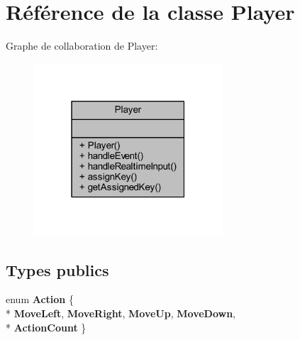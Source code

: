\hypertarget{class_player}{}\section{Référence de la classe Player}
\label{class_player}


Graphe de collaboration de Player\+:\nopagebreak
\begin{figure}[H]
\begin{center}
\leavevmode
\includegraphics[width=199pt]{class_player__coll__graph}
\end{center}
\end{figure}
\subsection*{Types publics}
\begin{DoxyCompactItemize}
\item 
enum {\bfseries Action} \{ \\*
{\bfseries Move\+Left}, 
{\bfseries Move\+Right}, 
{\bfseries Move\+Up}, 
{\bfseries Move\+Down}, 
\\*
{\bfseries Action\+Count}
 \}\hypertarget{class_player_a2da5df212d083bbb1460237f34ab0d88}{}\label{class_player_a2da5df212d083bbb1460237f34ab0d88}

\end{DoxyCompactItemize}
